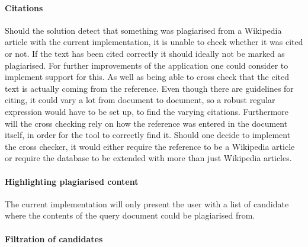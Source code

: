\paragraph{Citations}
Should the solution detect that something was plagiarised from a Wikipedia article with the current implementation, it is unable to check whether it was cited or not. If the text has been cited correctly it should ideally not be marked as plagiarised. For further improvements of the application one could consider to implement support for this. As well as being able to cross check that the cited text is actually coming from the reference. Even though there are guidelines for citing, it could vary a lot from document to document, so a robust regular expression would have to be set up, to find the varying citations. Furthermore will the cross checking rely on how the reference was entered in the document itself, in order for the tool to correctly find it. Should one decide to implement the cross checker, it would either require the reference to be a Wikipedia article or require the database to be extended with more than just Wikipedia articles.

\paragraph{Highlighting plagiarised content}
The current implementation will only present the user with a list of candidate where the contents of the query document could be plagiarised from. 

\paragraph{Filtration of candidates}
